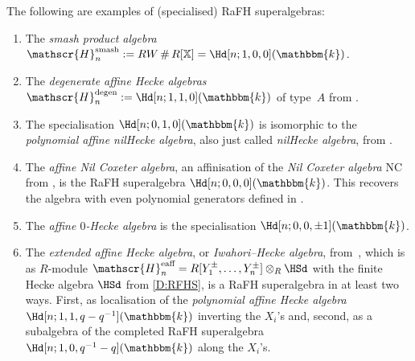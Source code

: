 \documentclass[a4paper,11pt]{amsart}
\newcommand\NC{\mathrm{NC}}
\numberwithin{equation}{subsection}
\theoremstyle{definition}
\theoremstyle{theorem}
\theoremstyle{remark}
\newcommand\Sym{W}
\newcommand\Heaff{\mathscr{H}^{\text{eaff}}_n}
\newcommand\Hdegen{\mathscr{H}^{\text{degen}}_n}
\newcommand\Hsmash{\mathscr{H}^{\text{smash}}_n}
\newcommand\X{\mathbb{X}}
\newcommand\kk{\mathbbm{k}}
\newcommand\RR{R}
\DeclareMathOperator\Smash{\#}
\begin{document}
\begin{Examples}\label{HHdexamples}
The following are examples of (specialised) RaFH superalgebras:
  \begin{enumerate}[series=HHexamples, label=(\alph*), ref=\autoref{HHdexamples}.(\alph*)]
   \item \label{ex:smash}The \emph{smash product algebra}  $\Hsmash:=\RR\Sym\Smash\RR[\X]=\Hd[n;1,0,0](\kk)$.
   \item \label{degaff} The \emph{degenerate affine Hecke algebras} $\Hdegen:=\Hd[n;1,1,0](\kk)$ of type~$A$ from  \cite{Drinfield:DegenerateHecke, Lusztig:AffineGradedHecke}.
   \item \label{nilHecke} The specialisation $\Hd[n;0,1,0](\kk)$ is isomorphic to the \emph{polynomial affine nilHecke algebra}, also just called \emph{ nilHecke algebra}, from \cite{KK86, KhovLaud:diagI}.
   \item The \emph{affine Nil Coxeter algebra}, an affinisation of the
   \emph{Nil Coxeter algebra} $\NC$ from \cite{NilCoxeter},  is the RaFH
   superalgebra $\Hd[n;0,0,0](\kk)$.  This recovers the algebra with even polynomial generators defined in \cite{SavageStuart}.
   \item The \emph{affine $0$-Hecke algebra} is the  specialisation $\Hd[n;0,0,\pm1](\kk)$.
   \item\label{ex:aff} The \emph{extended affine Hecke algebra}, or
   \emph{Iwahori--Hecke algebra},
     from~\cite{Macdonald:affine, IwahoriMatsumoto}, which is
     as $R$-module  $\Heaff=R[Y_1^{\pm},\dots,Y_n^{\pm}]\otimes_R\HSd$ with the finite Hecke algebra $\HSd$ from \autoref{D:RFHS},
     is a RaFH superalgebra in at least two ways.
     First, as localisation of the  \emph{polynomial affine Hecke
     algebra}  $\Hd[n;1,1,q-q^{-1}](\kk)$ inverting the $X_i$'s and,
     second, as a subalgebra of the completed RaFH superalgebra
     $\Hd[n;1,0,q^{-1}-q](\kk)$ along the $X_i$'s.


\end{enumerate}
\end{Examples}
\end{document}
